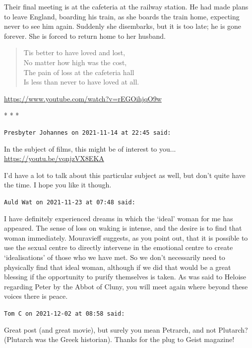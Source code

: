 Their final meeting is at the cafeteria at the railway station. He had made plans to leave England, boarding his train, as she boards the train home, expecting never to see him again. Suddenly she disembarks, but it is too late; he is gone forever. She is forced to return home to her husband.

\begin{quotex}
\begin{verse}
Tis better to have loved and lost,\\
No matter how high was the cost,\\
The pain of loss at the cafeteria hall\\
Is less than never to have loved at all.
\end{verse}
\end{quotex}

\url{https://www.youtube.com/watch?v=rEGOihjqO9w} 


\begin{center}* * *\end{center}

\begin{footnotesize}
\begin{sffamily}
\texttt{Presbyter Johannes on 2021-11-14 at 22:45 said:}

In the subject of films, this might be of interest to you... \url{https://youtu.be/vqnjzVX8EKA}


I'd have a lot to talk about this particular subject as well, but don't quite have the time. I hope you like it though.

\hfill

\texttt{Auld Wat on 2021-11-23 at 07:48 said:}

I have definitely experienced dreams in which the `ideal' woman for me has appeared. The sense of loss on waking is intense, and the desire is to find that woman immediately. Mouravieff suggests, as you point out, that it is possible to use the sexual centre to directly intervene in the emotional centre to create `idealisations' of those who we have met. So we don't necessarily need to physically find that ideal woman, although if we did that would be a great blessing if the opportunity to purify themselves is taken. As was said to Heloise regarding Peter by the Abbot of Cluny, you will meet again where beyond these voices there is peace.

\hfill

\texttt{Tom C on 2021-12-02 at 08:58 said:}

Great post (and great movie), but surely you mean Petrarch, and not Plutarch? (Plutarch was the Greek historian). Thanks for the plug to Geist magazine!

\end{sffamily}
\end{footnotesize}

